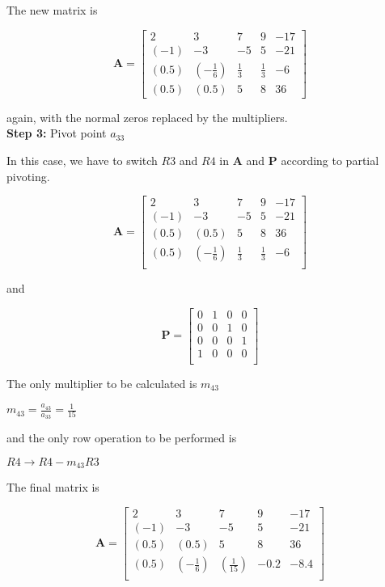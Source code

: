 \documentclass[11pt]{article}
\begin{document}
\begin{enumerate}
\begin{enumerate}[(a)]
				The new matrix is

				\[
					\mathbf{A}=
					\begin{bmatrix}
						2 & 3 & 7 & 9 & -17 \\
						(-1) & -3 & -5 & 5 & -21 \\
						(0.5) & (-\frac{1}{6}) & \frac{1}{3} & \frac{1}{3} & -6 \\
						(0.5) & (0.5) & 5 & 8 & 36
					\end{bmatrix}
				\]

				again, with the normal zeros replaced by the multipliers. \\

				\textbf{Step 3:} Pivot point $a_{33}$

				In this case, we have to switch $R3$ and $R4$ in $\mathbf{A}$ and $\mathbf{P}$ according to partial pivoting.

				\[
					\mathbf{A}=
					\begin{bmatrix}
						2 & 3 & 7 & 9 & -17 \\
						(-1) & -3 & -5 & 5 & -21 \\
						(0.5) & (0.5) & 5 & 8 & 36 \\
						(0.5) & (-\frac{1}{6}) & \frac{1}{3} & \frac{1}{3} & -6 \\
					\end{bmatrix}
				\]

				and

				\[
					\mathbf{P} =
					\begin{bmatrix}
						0 & 1 & 0 & 0 \\
						0 & 0 & 1 & 0 \\
						0 & 0 & 0 & 1 \\
						1 & 0 & 0 & 0 \\
					\end{bmatrix}
				\]

				The only multiplier to be calculated is $m_{43}$
				\begin{center}
					$m_{43} = \frac{a_{43}}{a_{33}} = \frac{1}{15}$
				\end{center}

				and the only row operation to be performed is
				\begin{center}
					$R4 \to R4 - m_{43}R3$
				\end{center}

				The final matrix is

				\[
					\mathbf{A}=
					\begin{bmatrix}
						2 & 3 & 7 & 9 & -17 \\
						(-1) & -3 & -5 & 5 & -21 \\
						(0.5) & (0.5) & 5 & 8 & 36 \\
						(0.5) & (-\frac{1}{6}) & (\frac{1}{15}) & -0.2 & -8.4 \\
					\end{bmatrix}
				\] \\


\end{enumerate}
\end{enumerate}
\end{document}
